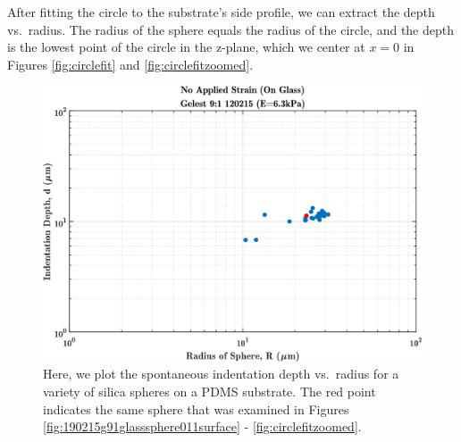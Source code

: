After fitting the circle to the substrate's side profile, we can extract the depth vs.~radius. The radius of the sphere equals the radius of the circle, and the depth is the lowest point of the circle in the z-plane, which we center at $ x=0 $ in Figures \ref{fig:circlefit} and \ref{fig:circlefitzoomed}.  
\begin{figure}
	\centering
	\includegraphics[width=\linewidth]{Chapters/Figures/d_vs_R_190215_sphere11highlight}
	\caption[Depth vs. Radius Example]{Here, we plot the spontaneous indentation depth vs.~radius for a variety of silica spheres on a PDMS substrate. The red point indicates the same sphere that was examined in Figures \ref{fig:190215g91glasssphere011surface} - \ref{fig:circlefitzoomed}.}
	\label{fig:dvsr190215sphere11highlight}
\end{figure}

